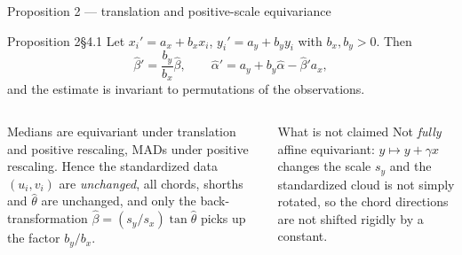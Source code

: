 \documentclass[aspectratio=169,9pt]{beamer}
\begin{document}
\begin{frame}{Proposition 2 --- translation and positive-scale equivariance}
\begin{rthm}{Proposition 2}{}{\S4.1}
Let $x_i'=a_x+b_xx_i$, $y_i'=a_y+b_yy_i$ with $b_x,b_y>0$. Then
\[\hat\beta'=\frac{b_y}{b_x}\hat\beta,\qquad \hat\alpha'=a_y+b_y\hat\alpha-\hat\beta'a_x,\]
and the estimate is invariant to permutations of the observations.
\end{rthm}
\begin{columns}[T]
\begin{rproof}
Medians are equivariant under translation and positive rescaling, MADs under positive rescaling. Hence the standardized data $(u_i,v_i)$ are \emph{unchanged}, all chords, shorths and $\hat\theta$ are unchanged, and only the back-transformation $\hat\beta=(s_y/s_x)\tan\hat\theta$ picks up the factor $b_y/b_x$.
\end{rproof}
\begin{rrem}{What is not claimed}
Not \emph{fully} affine equivariant: $y\mapsto y+\gamma x$ changes the scale $s_y$ and the standardized cloud is not simply rotated, so the chord directions are not shifted rigidly by a constant.
\end{rrem}
\end{columns}
\end{frame}
\end{document}
